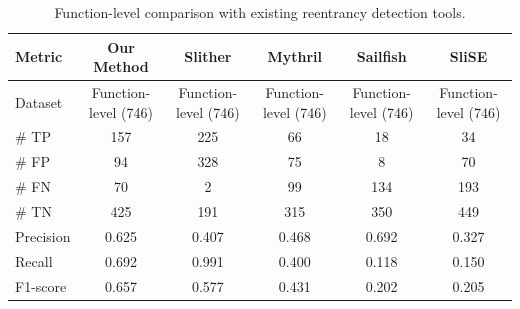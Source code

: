 \begin{table}[t]
\centering
\caption{Function-level comparison with existing reentrancy detection tools.}
\label{tab:function-level-comparison}
\begin{tabular}{lccccc}
\toprule
\textbf{Metric} & \textbf{Our Method} & \textbf{Slither} & \textbf{Mythril} & \textbf{Sailfish} & \textbf{SliSE} \\
\midrule
Dataset & Function-level (746) & Function-level (746) & Function-level (746) & Function-level (746) & Function-level (746) \\
\# TP & 157 & 225 & 66 & 18 & 34 \\
\# FP & 94 & 328 & 75 & 8 & 70 \\
\# FN & 70 & 2 & 99 & 134 & 193 \\
\# TN & 425 & 191 & 315 & 350 & 449 \\
Precision & 0.625 & 0.407 & 0.468 & 0.692 & 0.327 \\
Recall & 0.692 & 0.991 & 0.400 & 0.118 & 0.150 \\
F1-score & 0.657 & 0.577 & 0.431 & 0.202 & 0.205 \\
\bottomrule
\end{tabular}
\end{table}
